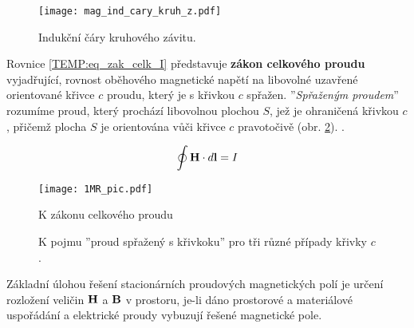     \begin{figure}[ht!]
      \centering
      \texttt{[image: mag\_ind\_cary\_kruh\_z.pdf]}
      \caption{Indukční čáry kruhového závitu.}
      \label{TEMP:fig_ind_c_kruh_z}
    \end{figure}    
    Rovnice \ref{TEMP:eq_zak_celk_I} představuje \textbf{zákon celkového proudu} vyjadřující,
    rovnost oběhového magnetické napětí na libovolné uzavřené orientované křivce $c$ proudu, který
    je s křivkou $c$ spřažen. ''\emph{Spřaženým proudem}'' rozumíme proud, který prochází 
    libovolnou plochou $S$, jež je ohraničená křivkou $c$, přičemž plocha $S$ je orientována vůči 
    křivce $c$ pravotočivě (obr. \ref{TEMP:fig_1MR_pic}). \cite[s.~55]{Mayer2001}.

      \begin{equation}\label{TEMP:eq_zak_celk_I}
        \oint\mathbf{H}\cdot d\mathbf{l} = I   
      \end{equation}    
     
      \begin{figure}[ht!]
         \centering
         \texttt{[image: 1MR\_pic.pdf]}
         \caption[Zákon celkového proudu]{K zákonu celkového proudu}
         \label{TEMP:fig_1MR_pic}
      \end{figure}

         \begin{figure}[hb!]
           \centering
           \caption[K pojmu ''proud spřažený s křivkoku'']{K pojmu ''proud spřažený s křivkoku''
                    pro tři různé případy křivky $c$.}
           \label{TEMP:fig_mag_sprazeny_proud123}
         \end{figure}
         
    Základní úlohou řešení stacionárních proudových magnetických polí je určení rozložení veličin 
    $\mathbf{H}$ a $\mathbf{B}$ v prostoru, je-li dáno prostorové a materiálové uspořádání a elektrické 
    proudy vybuzují řešené magnetické pole.
    
